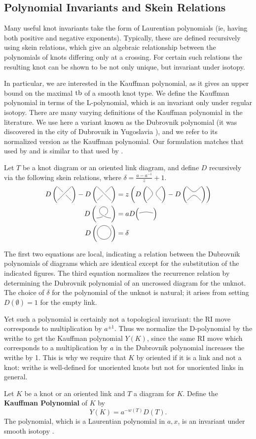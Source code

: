 \subsection{Polynomial Invariants and Skein Relations}

Many useful knot invariants take the form of Laurentian polynomials (ie, having both positive and negative exponents). Typically, these are defined recursively using skein relations, which give an algebraic relationship between the polynomials of knots differing only at a crossing. For certain such relations the resulting knot can be shown to be not only unique, but invariant under isotopy.

In particular, we are interested in the Kauffman polynomial, as it gives an upper bound on the maximal $\operatorname{tb}$ of a smooth knot type. We define the Kauffman polynomial in terms of the L-polynomial, which is an invariant only under regular isotopy.
There are many varying definitions of the Kauffman polynomial in the literature. We use here a variant known as the Dubrovnik polynomial (it was discovered in the city of Dubrovnik in Yugoslavia \cite{kauffman}), and we refer to its normalized version as the Kauffman polynomial. Our formulation matches that used by \cite{ferrand} and is similar to that used by \cite{lu-zhong}.

Let $T$ be a knot diagram or an oriented link diagram, and define $D$ recursively via the following skein relations, where $\delta = \frac{a - a^{-1}}{z} + 1$.
\begin{align}
    D\left(\Lmin\right) - D\left(\Lplus\right) &= z \left( D\left(\Lzero\right) - D\left(\Linf\right) \right) \\
    D\left(\Lr\right) &= a D \Big(\Ln\Big)\\
    D\left(\Lu\right) &= \delta
\end{align}

The first two equations are local, indicating a relation between the Dubrovnik polynomials of diagrams which are identical except for the substitution of the indicated figures. The third equation normalizes the recurrence relation by determining the Dubrovnik polynomial of an uncrossed diagram for the unknot. The choice of $\delta$ for the polynomial of the unknot is natural; it arises from setting $D(\emptyset) = 1$ for the empty link.

Yet such a polynomial is certainly not a topological invariant: the RI move corresponds to multiplication by $a^{\pm 1}$. Thus we normalize the D-polynomial by the writhe to get the Kauffman polynomial $Y(K)$, since the same RI move which corresponds to a multiplication by $a$ in the Dubrovnik polynomial increases the writhe by 1. This is why we require that $K$ by oriented if it is a link and not a knot: writhe is well-defined for unoriented knots but not for unoriented links in general.
\begin{definition}
    Let $K$ be a knot or an oriented link and $T$ a diagram for $K$. Define the \textbf{Kauffman Polynomial} of $K$ by
    \[
        Y(K) = a^{-w(T)} D(T).
    \]
    The polynomial, which is a Laurentian polynomial in $a, x$, is an invariant under smooth isotopy \cite{kauffman}.
\end{definition}

